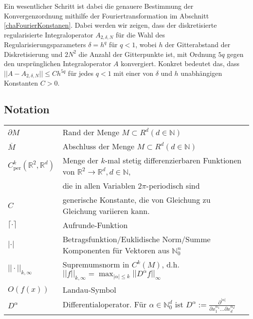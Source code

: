 \documentclass[12pt,a4paper]{scrartcl}
\numberwithin{equation}{section}
\newcommand{\R}{\mathbb{R}} %
\newcommand{\N}{\mathbb{N}} %
\newcommand{\per}{\operatorname{per}}
\begin{document}
Ein wesentlicher Schritt ist dabei die genauere Bestimmung der Konvergenzordnung mithilfe der Fouriertransformation im Abschnitt \ref{chaFourierKonstanen}.
Dabei werden wir zeigen, dass der diskretisierte regularisierte Integraloperator $A_{2,\delta,N}$ für die Wahl des Regularisierungsparameters $\delta=h^q$ für $q<1$, wobei $h$ der Gitterabstand der Diskretisierung und $2 N^2$ die Anzahl der Gitterpunkte ist, mit Ordnung $5q$ gegen den ursprünglichen Integraloperator $A$ konvergiert. Konkret bedeutet das, dass $||A-A_{2,\delta,N}|| \leq C h^{5q}$ für jedes $q<1$ mit einer von $\delta$ und $h$ unabhängigen Konstanten $C>0$.  

\subsection{Notation}
   \begin{table}[!ht]
    
     \begin{tabular}{ll}
       $\partial M$          & Rand der Menge $M \subset R^d (d \in \N)$          \\
       $\overline{M}$       & Abschluss der Menge $M \subset R^d (d \in \N)$          \\
       $C_{\per}^k(\R^2,\R^d)$        & Menge der $k$-mal stetig differenzierbaren Funktionen von $\R^2 \to \R^d, d \in \N$, \\& die in allen Variablen $2 \pi$-periodisch sind              \\
       $C$ &             generische Konstante, die von Gleichung zu Gleichung variieren kann. \\
       $\lceil \cdot \rceil$ & Aufrunde-Funktion \\
       $|\cdot|$   & Betragsfunktion/Euklidische Norm/Summe Komponenten für Vektoren aus $\N_0^n$ \\
       $||\cdot||_{k,\infty}$ & Supremumsnorm in $C^{k}(M)$, d.h. $||f||_{k,\infty}=\max_{|\alpha|\leq k}||D^\alpha f||_{\infty} $\\
       $O(f(x))$ & Landau-Symbol \\
       $D^\alpha$ & Differentialoperator. Für $\alpha \in \N_0^d$ ist $D^\alpha := \frac{\partial^{|\alpha|}}{\partial x_1^{\alpha_1} \dots \partial x_d^{\alpha_d}}$
     \end{tabular}
\end{table}
  
 \thispagestyle{empty}


\vspace*{5cm}
\end{document}

